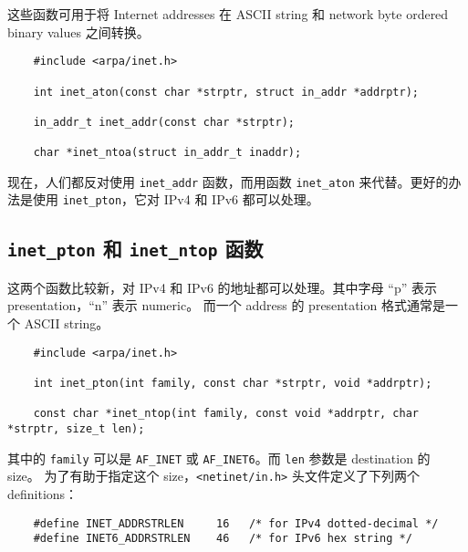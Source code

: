     这些函数可用于将 Internet addresses 在 ASCII string 和 network byte ordered binary values 之间转换。

    \begin{verbatim}
    #include <arpa/inet.h>

    int inet_aton(const char *strptr, struct in_addr *addrptr);
    
    in_addr_t inet_addr(const char *strptr);

    char *inet_ntoa(struct in_addr_t inaddr);
    \end{verbatim}

    现在，人们都反对使用 \texttt{inet\_addr} 函数，而用函数 \texttt{inet\_aton} 来代替。更好的办法是使用 \texttt{inet\_pton}，它对 IPv4 和 IPv6 都可以处理。

  \subsection{\texttt{inet\_pton} 和 \texttt{inet\_ntop} 函数}

    这两个函数比较新，对 IPv4 和 IPv6 的地址都可以处理。其中字母 “p” 表示 presentation，“n” 表示 numeric。
    而一个 address 的 presentation 格式通常是一个 ASCII string。

    \begin{verbatim}
    #include <arpa/inet.h>

    int inet_pton(int family, const char *strptr, void *addrptr);

    const char *inet_ntop(int family, const void *addrptr, char *strptr, size_t len);
    \end{verbatim}

    其中的 \texttt{family} 可以是 \texttt{AF\_INET} 或 \texttt{AF\_INET6}。而 \texttt{len} 参数是 destination 的 size。
    为了有助于指定这个 size，\texttt{<netinet/in.h>} 头文件定义了下列两个 definitions：

    \begin{verbatim}
    #define INET_ADDRSTRLEN     16   /* for IPv4 dotted-decimal */
    #define INET6_ADDRSTRLEN    46   /* for IPv6 hex string */
    \end{verbatim}
